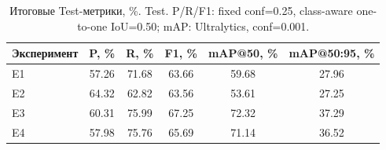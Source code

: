 \begin{table}[t]
\centering
\caption{Итоговые Test-метрики, \%. Test. P/R/F1: fixed conf=0.25, class-aware one-to-one IoU=0.50; mAP: Ultralytics, conf=0.001.}
\label{tab:test_metrics}
\scriptsize
\begin{tabular*}{\textwidth}{@{\extracolsep{\fill}}lccccc}
\hline
Эксперимент & P, \% & R, \% & F1, \% & mAP@50, \% & mAP@50:95, \% \\
\hline
E1 & 57.26 & 71.68 & 63.66 & 59.68 & 27.96 \\
E2 & 64.32 & 62.82 & 63.56 & 53.61 & 27.25 \\
E3 & 60.31 & 75.99 & 67.25 & 72.32 & 37.29 \\
E4 & 57.98 & 75.76 & 65.69 & 71.14 & 36.52 \\
\hline
\end{tabular*}
\end{table}
